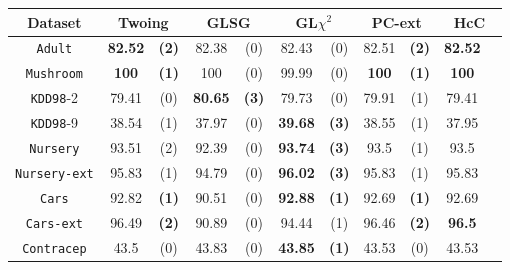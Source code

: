 \begin{table}
\small
\centering
\begin{tabular}{c|cc|cc|cc|cc|cc} 
Dataset             & \multicolumn{2}{c|}{Twoing} &  \multicolumn{2}{c|}{GLSG}  & \multicolumn{2}{c|}{GL$\chi^2$} & \multicolumn{2}{c|}{PC-ext}& \multicolumn{2}{c}{HcC}\\ \hline
{\tt Adult}         &  {\bf 82.52} & {\bf (2)}    &  82.38       &  (0)         &  82.43       & (0)              & 82.51      & {\bf (2)}    & {\bf 82.52}&            \\
{\tt Mushroom}      &  {\bf 100}   & {\bf (1)}    &  100         &  (0)         &  99.99       & (0)              & {\bf 100 } & {\bf (1)}    & {\bf 100}  &            \\
{\tt KDD98}-2       &  79.41       & (0)          &  {\bf 80.65} & {\bf (3)}    &  79.73       & (0)              & 79.91      & (1)          & 79.41      &            \\
{\tt KDD98}-9       &  38.54       & (1)          &  37.97       & (0)          &  {\bf 39.68} & {\bf (3)}        & 38.55      & (1)          & 37.95      &            \\
{\tt Nursery}       &  93.51       & (2)          &  92.39       & (0)          &  {\bf 93.74} & {\bf (3)}        & 93.5       & (1)          & 93.5       &            \\
{\tt Nursery-ext}   &  95.83       & (1)          &  94.79       & (0)          &  {\bf 96.02} & {\bf (3)}        & 95.83      & (1)          & 95.83      &            \\
{\tt Cars}          &  92.82       & {\bf (1)}    &  90.51       & (0)          &  {\bf 92.88} & {\bf (1)}        & 92.69      & {\bf (1)}    & 92.69      &            \\
{\tt Cars-ext}      &  96.49       & {\bf (2)}    &  90.89       & (0)          &  94.44       & (1)              & 96.46      & {\bf (2)}    & {\bf 96.5} &            \\
{\tt Contracep}     &  43.5        & (0)          &  43.83       & (0)          &  {\bf 43.85} & {\bf (1)}        & 43.53      & (0)          & 43.53      &            \\

\end{tabular}
\end{table}
